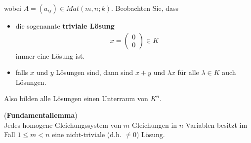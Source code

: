 \documentclass[11pt]{report}
\newcommand*\f[1] {\textbf{#1}}
\begin{document}
wobei $A = (a_{ij}) \in Mat(m,n; k)$. Beobachten Sie, dass
\begin{itemize}
 \item die sogenannte \f{triviale Lösung}
\begin{align}
 x = \begin{pmatrix} 0 \\ 0 \end{pmatrix} \in K
\end{align}
immer eine Lösung ist.
\item falls $x$ und $y$ Lösungen sind, dann sind $x+y$ und $\lambda x$  für alle $\lambda \in K$ auch Lösungen.
\end{itemize}
Also bilden alle Lösungen einen Unterraum von $K^n$.

\begin{lemma} (\f{Fundamentallemma})\\
 \label{lemma333} 
Jedes homogene Gleichungssystem von $m$ Gleichungen in $n$ Variablen besitzt im Fall $1 \leq m < n$ eine nicht-triviale (d.h. $\neq 0$) Lösung.
\end{lemma}
\end{document}
